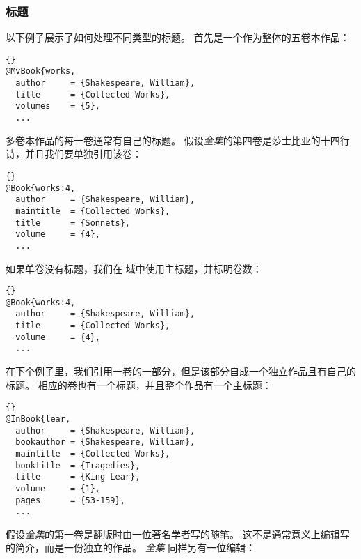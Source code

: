 \subsubsection{标题}
\label{bib:use:ttl}

以下例子展示了如何处理不同类型的标题。
首先是一个作为整体的五卷本作品：

\begin{lstlisting}[style=bibtex]{}
@MvBook{works,
  author     = {Shakespeare, William},
  title      = {Collected Works},
  volumes    = {5},
  ...
\end{lstlisting}
%
多卷本作品的每一卷通常有自己的标题。
假设\emph{全集}的第四卷是莎士比亚的十四行诗，并且我们要单独引用该卷：

\begin{lstlisting}[style=bibtex]{}
@Book{works:4,
  author     = {Shakespeare, William},
  maintitle  = {Collected Works},
  title      = {Sonnets},
  volume     = {4},
  ...
\end{lstlisting}
%
如果单卷没有标题，我们在  域中使用主标题，并标明卷数：

\begin{lstlisting}[style=bibtex]{}
@Book{works:4,
  author     = {Shakespeare, William},
  title      = {Collected Works},
  volume     = {4},
  ...
\end{lstlisting}
%
在下个例子里，我们引用一卷的一部分，但是该部分自成一个独立作品且有自己的标题。
相应的卷也有一个标题，并且整个作品有一个主标题：

\begin{lstlisting}[style=bibtex]{}
@InBook{lear,
  author     = {Shakespeare, William},
  bookauthor = {Shakespeare, William},
  maintitle  = {Collected Works},
  booktitle  = {Tragedies},
  title      = {King Lear},
  volume     = {1},
  pages      = {53-159},
  ...
\end{lstlisting}
%
假设\emph{全集}的第一卷是翻版时由一位著名学者写的随笔。
这不是通常意义上编辑写的简介，而是一份独立的作品。
\emph{全集} 同样另有一位编辑：

